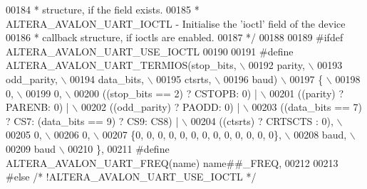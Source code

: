 \begin{DoxyCode}
00184 \textcolor{comment}{ *                              structure, if the field exists.}
00185 \textcolor{comment}{ * ALTERA\_AVALON\_UART\_IOCTL   - Initialise the 'ioctl' field of the device}
00186 \textcolor{comment}{ *                              callback structure, if ioctls are enabled.}
00187 \textcolor{comment}{ */}
00188 
00189 \textcolor{preprocessor}{#ifdef ALTERA\_AVALON\_UART\_USE\_IOCTL}
00190 
00191 \textcolor{preprocessor}{#define ALTERA\_AVALON\_UART\_TERMIOS(stop\_bits,               \(\backslash\)}
00192 \textcolor{preprocessor}{                                   parity,                  \(\backslash\)}
00193 \textcolor{preprocessor}{                                   odd\_parity,              \(\backslash\)}
00194 \textcolor{preprocessor}{                                   data\_bits,               \(\backslash\)}
00195 \textcolor{preprocessor}{                                   ctsrts,                  \(\backslash\)}
00196 \textcolor{preprocessor}{                                   baud)                    \(\backslash\)}
00197 \textcolor{preprocessor}{\{                                                           \(\backslash\)}
00198 \textcolor{preprocessor}{  0,                                                        \(\backslash\)}
00199 \textcolor{preprocessor}{  0,                                                        \(\backslash\)}
00200 \textcolor{preprocessor}{  ((stop\_bits == 2) ? CSTOPB: 0)      |                     \(\backslash\)}
00201 \textcolor{preprocessor}{    ((parity) ? PARENB: 0)            |                     \(\backslash\)}
00202 \textcolor{preprocessor}{    ((odd\_parity) ? PAODD: 0)         |                     \(\backslash\)}
00203 \textcolor{preprocessor}{    ((data\_bits == 7) ? CS7: (data\_bits == 9) ? CS9: CS8) | \(\backslash\)}
00204 \textcolor{preprocessor}{    ((ctsrts) ? CRTSCTS : 0),                               \(\backslash\)}
00205 \textcolor{preprocessor}{  0,                                                        \(\backslash\)}
00206 \textcolor{preprocessor}{  0,                                                        \(\backslash\)}
00207 \textcolor{preprocessor}{  \{0, 0, 0, 0, 0, 0, 0, 0, 0, 0, 0, 0, 0\},                  \(\backslash\)}
00208 \textcolor{preprocessor}{  baud,                                                     \(\backslash\)}
00209 \textcolor{preprocessor}{  baud                                                      \(\backslash\)}
00210 \textcolor{preprocessor}{\},}
00211 \textcolor{preprocessor}{#define ALTERA\_AVALON\_UART\_FREQ(name) name##\_FREQ,}
00212 
00213 \textcolor{preprocessor}{#else }\textcolor{comment}{/* !ALTERA\_AVALON\_UART\_USE\_IOCTL */}\textcolor{preprocessor}{}

\end{DoxyCode}
